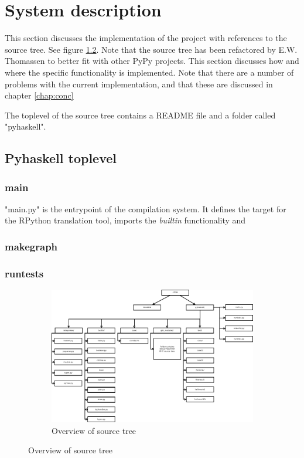 

\chapter{System description}

This section discusses the implementation of the project with
references to the source tree. See figure \ref{fig:overview}.
Note that the source tree has been refactored by E.W. Thomassen
to better fit with other PyPy projects. This section discusses how
and where the specific functionality is implemented. Note that there
are a number of problems with the current implementation, and that
these are discussed in chapter \ref{chap:conc}

The toplevel of the source tree contains a README file and a folder
called "pyhaskell".

\section{Pyhaskell toplevel}


\subsection{main}

"main.py" is the entrypoint of the compilation system. It defines
the target for the RPython translation tool, imports the \emph{builtin}
functionality and 

\subsection{makegraph}

\subsection{runtests}



\begin{figure}
\begin{figure}[H]
\centering
\includegraphics[width=\textheight]{../diags/overview.pdf}

\caption{Overview of source tree}
\label{fig:overview}

\end{figure}
\end{figure}




